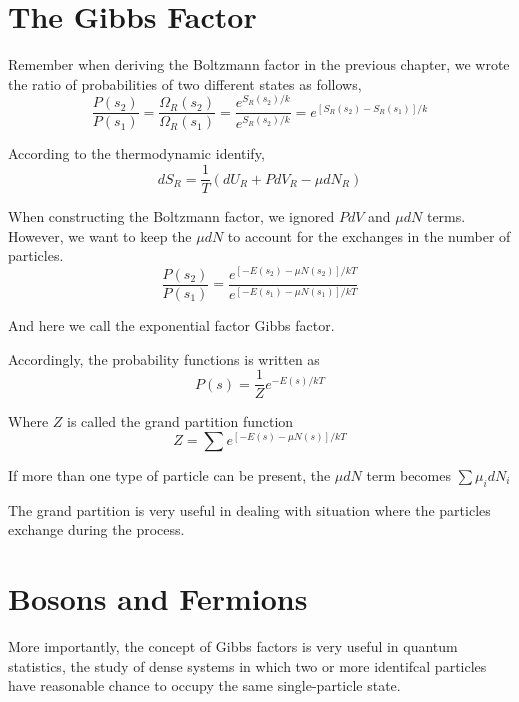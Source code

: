 


\section{The Gibbs Factor}
Remember when deriving the Boltzmann factor in the previous chapter, we wrote the ratio of probabilities of 
two different states as follows,
\begin{equation} 
\frac{P(s_2)}{P(s_1)} = \frac{\Omega_R(s_2)}{\Omega_R(s_1)} 
                      = \frac{e^{S_R(s_2)/k}}{e^{S_R(s_2)/k}}
                      = e^{[S_R(s_2)-S_R(s_1)]/k}
\end{equation}

According to the thermodynamic identify,
\begin{equation}
dS_R = \frac{1}{T} (dU_R + PdV_R - \mu dN_R) 
\end{equation}

When constructing the Boltzmann factor, we ignored $PdV$ and $\mu dN$ terms. However, we want to keep the  $\mu dN$ to account
for the exchanges in the number of particles. 
\begin{equation}
\frac{P(s_2)}{P(s_1)} = \frac{e^{[-E(s_2)-\mu N(s_2)]/kT}}{e^{[-E(s_1)-\mu N(s_1)]/kT}}
\end{equation}

And here we call the exponential factor Gibbs factor.

Accordingly, the probability functions is written as
\begin{equation}
P(s) = \frac{1}{Z}e^{-E(s)/kT}
\end{equation}

Where $Z$ is called the grand partition function
\begin{equation}
Z = \sum e^{[-E(s)-\mu N(s)]/kT}
\end{equation}

If more than one type of particle can be present, the $\mu dN$ term becomes $\sum {\mu_i dN_i}$

The grand partition is very useful in dealing with situation where the particles exchange during the process.


\section{Bosons and Fermions}
More importantly, the concept of Gibbs factors is very useful in quantum statistics, the study of dense systems in which two
or more identifcal particles have reasonable chance to occupy the same single-particle state.

